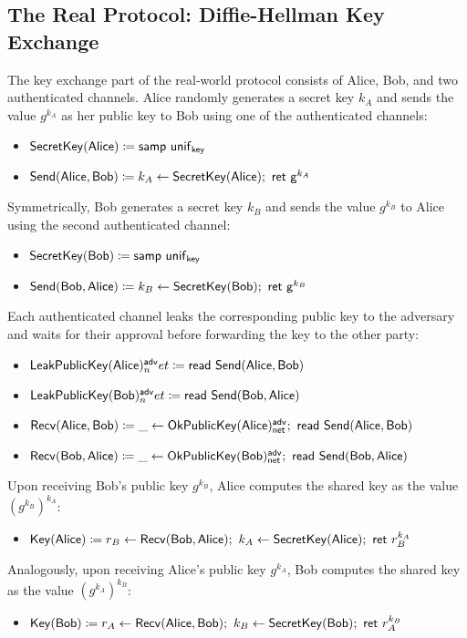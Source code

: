 \subsection{The Real Protocol: Diffie-Hellman Key Exchange}
The key exchange part of the real-world protocol consists of Alice, Bob, and two authenticated channels. Alice randomly generates a secret key $k_A$ and sends the value $g^{k_A}$ as her public key to Bob using one of the authenticated channels:
\begin{itemize}
\item $\mathsf{SecretKey}(\mathsf{Alice}) \coloneqq \mathsf{samp} \ \mathsf{unif}_{\mathsf{key}}$
\item $\mathsf{Send}(\mathsf{Alice},\mathsf{Bob}) \coloneqq k_A \leftarrow \mathsf{SecretKey}(\mathsf{Alice}); \ \mathsf{ret} \ \mathsf{g}^{k_A}$
\end{itemize}
Symmetrically, Bob generates a secret key $k_B$ and sends the value $g^{k_B}$ to Alice using the second authenticated channel:
\begin{itemize}
\item $\mathsf{SecretKey}(\mathsf{Bob}) \coloneqq \mathsf{samp} \ \mathsf{unif}_{\mathsf{key}}$
\item $\mathsf{Send}(\mathsf{Bob},\mathsf{Alice}) \coloneqq k_B \leftarrow \mathsf{SecretKey}(\mathsf{Bob}); \ \mathsf{ret} \ \mathsf{g}^{k_B}$
\end{itemize}
Each authenticated channel leaks the corresponding public key to the adversary and waits for their approval before forwarding the key to the other party:
\begin{itemize}
\item $\mathsf{LeakPublicKey}(\mathsf{Alice})^{\mathsf{adv}}_net \coloneqq \mathsf{read} \ \mathsf{Send}(\mathsf{Alice},\mathsf{Bob})$
\item $\mathsf{LeakPublicKey}(\mathsf{Bob})^{\mathsf{adv}}_net \coloneqq \mathsf{read} \ \mathsf{Send}(\mathsf{Bob},\mathsf{Alice})$
\item $\Recv(\Alice,\Bob) \coloneqq \_ \leftarrow \OkPublicKey(\Alice)^\adv_\net; \ \read{\Send(\Alice,\Bob)}$
\item $\Recv(\Bob,\Alice) \coloneqq \_ \leftarrow \OkPublicKey(\Bob)^\adv_\net; \ \read{\Send(\Bob,\Alice)}$
\end{itemize}
Upon receiving Bob's public key $g^{k_B}$, Alice computes the shared key as the value $(g^{k_B})^{k_A}$:
\begin{itemize}
\item $\Key(\Alice) \coloneqq r_B \leftarrow \Recv(\Bob,\Alice); \ k_A \leftarrow \SecretKey(\Alice); \ \ret{r_B^{k_A}}$
\end{itemize}
Analogously, upon receiving Alice's public key $g^{k_A}$, Bob computes the shared key as the value $(g^{k_A})^{k_B}$:
\begin{itemize}
\item $\Key(\Bob) \coloneqq r_A \leftarrow \Recv(\Alice,\Bob); \ k_B \leftarrow \SecretKey(\Bob); \ \ret{r_A^{k_B}}$
\end{itemize}
